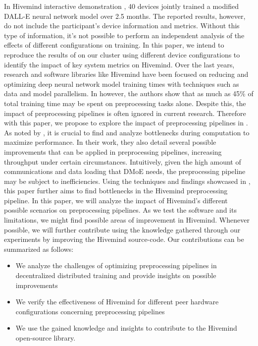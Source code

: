 In Hivemind interactive demonstration \cite{hivemind}, 40 devices jointly trained a modified DALL-E \cite{ramesh2021zero} neural network model over 2.5 months.
The reported results, however, do not include the participant's device information and metrics.
Without this type of information, it's not possible to perform an independent analysis of the effects of different configurations on training.
In this paper, we intend to reproduce the results of \cite{hivemind} on our cluster using different device configurations to identify the impact of key system metrics on Hivemind.
Over the last years, research and software libraries like Hivemind have been focused on reducing and optimizing deep neural network model training times with techniques such as data and model parallelism.
In \cite{xin2021production} however, the authors show that as much as 45\% of total training time may be spent on preprocessing tasks alone.
Despite this, the impact of preprocessing pipelines is often ignored in current research.
Therefore with this paper, we propose to explore the impact of preprocessing pipelines in \cite{hivemind}.
As noted by \cite{isenko2022bottleneck}, it is crucial to find and analyze bottlenecks during computation to maximize performance.
In their work, they also detail several possible improvements that can be applied in preprocessing pipelines, increasing throughput under certain circumstances.
Intuitively, given the high amount of communications and data loading that DMoE needs, the preprocessing pipeline may be subject to inefficiencies.
Using the techniques and findings showcased in \cite{isenko2022bottleneck}, this paper further aims to find bottlenecks in the Hivemind preprocessing pipeline.
In this paper, we will analyze the impact of Hivemind's different possible scenarios on preprocessing pipelines.
As we test the software and its limitations, we might find possible areas of improvement in Hivemind.
Whenever possible, we will further contribute using the knowledge gathered through our experiments by improving the Hivemind \cite{hivemind} source-code.
Our contributions can be summarized as follows:
\begin{itemize}
    \item We analyze the challenges of optimizing preprocessing pipelines in decentralized distributed training and provide insights on possible improvements
    \item We verify the effectiveness of Hivemind for different peer hardware configurations concerning preprocessing pipelines
    \item We use the gained knowledge and insights to contribute to the Hivemind open-source library.
\end{itemize}
